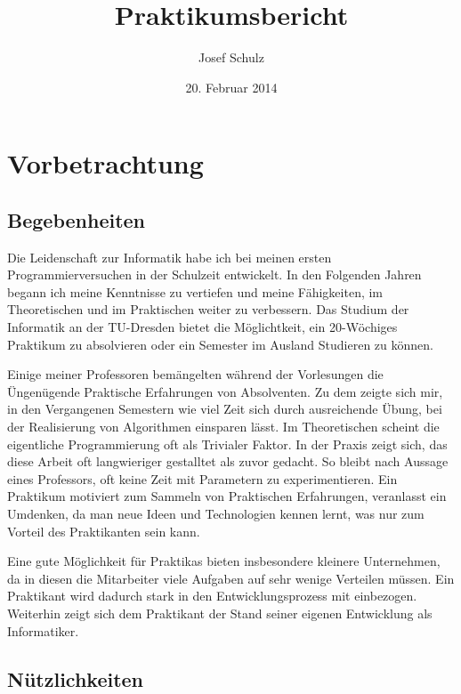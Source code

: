 \documentclass[12pt]{article}
\title{Praktikumsbericht}
\author{Josef Schulz}
\date{20. Februar 2014}
\begin{document}
 
\maketitle

\newpage

\tableofcontents

\newpage

\section{Vorbetrachtung}

\subsection{Begebenheiten}

Die Leidenschaft zur Informatik habe ich bei meinen ersten Programmierversuchen in der Schulzeit entwickelt.
In den Folgenden Jahren begann ich meine Kenntnisse zu vertiefen und meine Fähigkeiten, im Theoretischen
und im Praktischen weiter zu verbessern. Das Studium der Informatik an der TU-Dresden bietet die Möglichtkeit,
ein 20-Wöchiges Praktikum zu absolvieren oder ein Semester im Ausland Studieren zu können.

Einige meiner Professoren bemängelten während der Vorlesungen die Üngenügende Praktische Erfahrungen von
Absolventen. Zu dem zeigte sich mir, in den Vergangenen Semestern wie viel Zeit sich durch ausreichende Übung,
bei der Realisierung von Algorithmen einsparen lässt. Im Theoretischen scheint die eigentliche Programmierung
oft als Trivialer Faktor. In der Praxis zeigt sich, das diese Arbeit oft langwieriger gestalltet als zuvor
gedacht. So bleibt nach Aussage eines Professors, oft keine Zeit mit Parametern zu experimentieren.
Ein Praktikum motiviert zum Sammeln von Praktischen Erfahrungen, veranlasst ein Umdenken, da man neue Ideen und
Technologien kennen lernt, was nur zum Vorteil des Praktikanten sein kann.

Eine gute Möglichkeit für Praktikas bieten insbesondere kleinere Unternehmen, da in diesen die Mitarbeiter
viele Aufgaben auf sehr wenige Verteilen müssen. Ein Praktikant wird dadurch stark in den Entwicklungsprozess
mit einbezogen. Weiterhin zeigt sich dem Praktikant der Stand seiner eigenen Entwicklung als Informatiker.

\subsection{Nützlichkeiten}
\end{document}
